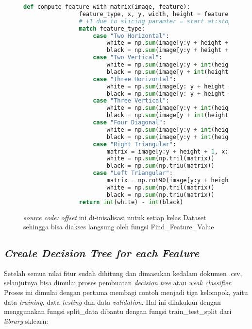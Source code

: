 	\begin{figure}[H]
		\begin{lstlisting}[language=Python, basicstyle=\tiny]
			def compute_feature_with_matrix(image, feature):
				feature_type, x, y, width, height = feature
				# +1 due to slicing paramter = start at:stop before
				match feature_type:
					case "Two Horizontal":
						white = np.sum(image[y:y + height + 1, x:x + int(width/2) + 1])
						black = np.sum(image[y:y + height + 1, x + int(width/2):x + width + 1])
					case "Two Vertical":
						white = np.sum(image[y:y + int(height/2) + 1, x:x + width+1])
						black = np.sum(image[y + int(height/2):y + height + 1, x:x + width+1])
					case "Three Horizontal":
						white = np.sum(image[y: y + height + 1, x:x + int(width/3) + 1]) + np.sum(image[y: y + height + 1, x + int(width*2/3):x + width + 1])
						black = np.sum(image[y: y + height + 1, x + int(width/3):x + int(width*2/3) + 1])
					case "Three Vertical":
						white = np.sum(image[y:y + int(height/3) + 1, x:x + width + 1]) + np.sum(image[y + int(height*2/3):y + height + 1, x: x + width + 1])
						black = np.sum(image[y + int(height/3):y + int(height*2/3) + 1, x:x + width + 1])
					case "Four Diagonal":
						white = np.sum(image[y:y + int(height/2) + 1, x + int(width/2): x + width + 1]) + np.sum(image[y + int(height/2):y + height + 1, x: x + int(width/2) + 1])
						black = np.sum(image[y:y + int(height/2) + 1, x:x + int(width/2) + 1]) + np.sum(image[y + int(height/2): y + height + 1, x + int(width/2):x + width + 1])
					case "Right Triangular":
						matrix = image[y:y + height + 1, x:x + width + 1]
						white = np.sum(np.tril(matrix))
						black = np.sum(np.triu(matrix))
					case "Left Triangular":
						matrix = np.rot90(image[y:y + height + 1, x:x + width + 1], k=3)
						white = np.sum(np.tril(matrix))
						black = np.sum(np.triu(matrix))
				return int(white) - int(black)
		\end{lstlisting}
		\caption{\emph{source code:} \textit{offset} ini di-inisalisasi untuk setiap kelas Dataset 
		sehingga bisa diakses langsung oleh fungsi Find\_Feature\_Value}
		\label{code: feature calculation}
	\end{figure}

	\subsection{\textit{Create Decision Tree for each Feature}}
		Setelah semua nilai fitur sudah dihitung dan dimasukan kedalam dokumen .csv, 
		selanjutnya bisa dimulai proses pembuatan \emph{decision tree} atau \emph{weak classifier}. 
		Proses ini dimulai dengan pertama membagi contoh menjadi tiga kelompok, yaitu data \emph{training}, 
		data \emph{testing} dan data \emph{validation}. Hal ini dilakukan dengan menggunakan fungsi 
		split\_data dibantu dengan fungsi train\_test\_split dari \textit{library} sklearn:

